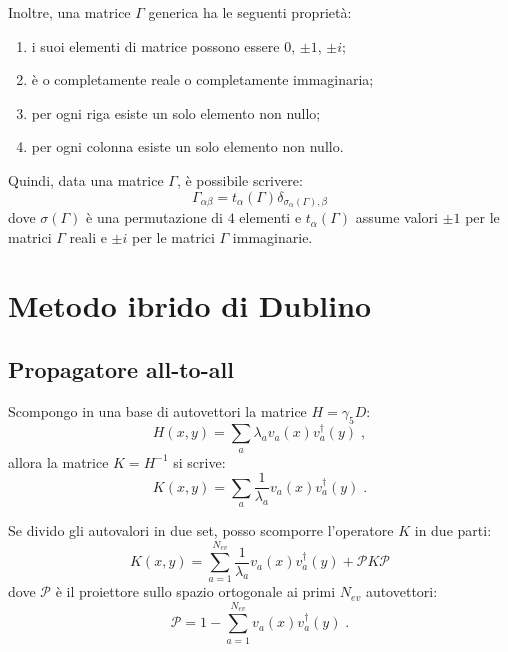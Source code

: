 \documentclass[a4paper]{article}
\newcommand{\point}{\; .}
\newcommand{\comma}{\; ,}
\begin{document}
Inoltre, una matrice $\Gamma$ generica ha le seguenti propriet\`{a}:
\begin{enumerate}
\item i suoi elementi di matrice possono essere $0$, $\pm 1$, $\pm i$;
\item \`{e} o completamente reale o completamente immaginaria;
\item per ogni riga esiste un solo elemento non nullo;
\item per ogni colonna esiste un solo elemento non nullo.
\end{enumerate}
Quindi, data una matrice $\Gamma$, \`{e} possibile scrivere:
\begin{equation} \label{gamma_ab}
\Gamma_{\alpha\beta} = t_\alpha(\Gamma) \delta_{\sigma_\alpha(\Gamma), \beta}
\end{equation}
dove $\sigma(\Gamma)$ \`{e} una permutazione di $4$ elementi e $t_\alpha(\Gamma)$ assume valori $\pm 1$ per le matrici $\Gamma$ reali e $\pm i$ per le matrici $\Gamma$ immaginarie.





\section{Metodo ibrido di Dublino}



\subsection{Propagatore all-to-all}

Scompongo in una base di autovettori la matrice $H = \gamma_5 D$:
\begin{equation*}
H(x,y) = \sum_a \lambda_a v_a(x) v_a^\dagger(y) \comma
\end{equation*}
allora la matrice $K = H^{-1}$ si scrive:
\begin{equation*}
K(x,y) = \sum_a \frac{1}{\lambda_a} v_a(x) v_a^\dagger(y) \point
\end{equation*}

Se divido gli autovalori in due set, posso scomporre l'operatore $K$ in due parti:
\begin{equation} \label{K1}
K(x,y) = \sum_{a=1}^{N_{ev}} \frac{1}{\lambda_a} v_a(x) v_a^\dagger(y) + \mathcal{P}K\mathcal{P}
\end{equation}
dove $\mathcal{P}$ \`{e} il proiettore sullo spazio ortogonale ai primi $N_{ev}$ autovettori:
\begin{equation*}
\mathcal{P} = 1 - \sum_{a=1}^{N_{ev}} v_a(x) v_a^\dagger(y) \point
\end{equation*}
\end{document}
